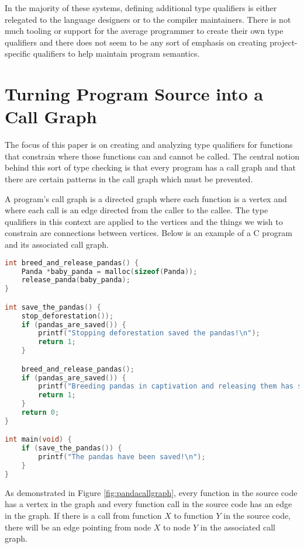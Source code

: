 In the majority of these systems, defining additional type qualifiers is either relegated to the language designers or to the compiler maintainers.  There is not much tooling or support for the average programmer to create their own type qualifiers and there does not seem to be any sort of emphasis on creating project-specific qualifiers to help maintain program semantics.

\section{Turning Program Source into a Call Graph}\label{sec:bac:callgraph}

The focus of this paper is on creating and analyzing type qualifiers for functions that constrain where those functions can and cannot be called.  The central notion behind this sort of type checking is that every program has a call graph and that there are certain patterns in the call graph which must be prevented.  

A program's call graph is a directed graph where each function is a vertex and where each call is an edge directed from the caller to the callee.  The type qualifiers in this context are applied to the vertices and the things we wish to constrain are connections between vertices.  Below is an example of a C program and its associated call graph.

\begin{minipage}[c]{0.95\textwidth}
\begin{lstlisting}[language=C,caption={Example C program.  The call graph for this program is shown in Figure \ref{fig:pandacallgraph}},label={lst:pandasource}]
int breed_and_release_pandas() {
    Panda *baby_panda = malloc(sizeof(Panda));
    release_panda(baby_panda);
}

int save_the_pandas() {
	stop_deforestation());
	if (pandas_are_saved()) {
		printf("Stopping deforestation saved the pandas!\n");
		return 1;
	}

	breed_and_release_pandas();
	if (pandas_are_saved()) {
		printf("Breeding pandas in captivation and releasing them has saved the pandas!\n");
		return 1;
	}
	return 0;
}

int main(void) {
	if (save_the_pandas()) {
		printf("The pandas have been saved!\n");
	}
}
\end{lstlisting}
\end{minipage}



As demonstrated in Figure \ref{fig:pandacallgraph}, every function in the source code has a vertex in the graph and every function call in the source code has an edge in the graph.  If there is a call from function $X$ to function $Y$ in the source code, there will be an edge pointing from node $X$ to node $Y$ in the associated call graph. 

